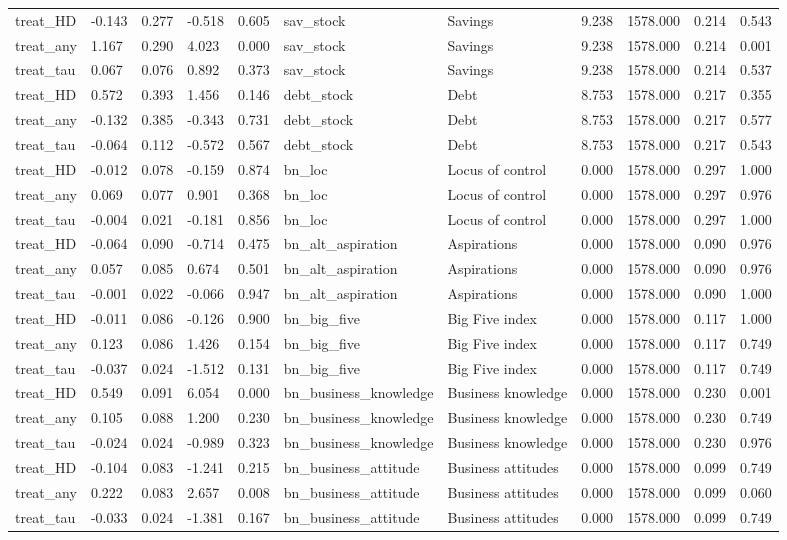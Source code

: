 \begin{tabular}{lllllllllll}
treat\_HD & -0.143 & 0.277 & -0.518 & 0.605 & sav\_stock & Savings & 9.238 & 1578.000 & 0.214 & 0.543 \\
treat\_any & 1.167 & 0.290 & 4.023 & 0.000 & sav\_stock & Savings & 9.238 & 1578.000 & 0.214 & 0.001 \\
treat\_tau & 0.067 & 0.076 & 0.892 & 0.373 & sav\_stock & Savings & 9.238 & 1578.000 & 0.214 & 0.537 \\
treat\_HD & 0.572 & 0.393 & 1.456 & 0.146 & debt\_stock & Debt & 8.753 & 1578.000 & 0.217 & 0.355 \\
treat\_any & -0.132 & 0.385 & -0.343 & 0.731 & debt\_stock & Debt & 8.753 & 1578.000 & 0.217 & 0.577 \\
treat\_tau & -0.064 & 0.112 & -0.572 & 0.567 & debt\_stock & Debt & 8.753 & 1578.000 & 0.217 & 0.543 \\
treat\_HD & -0.012 & 0.078 & -0.159 & 0.874 & bn\_loc & Locus of control & 0.000 & 1578.000 & 0.297 & 1.000 \\
treat\_any & 0.069 & 0.077 & 0.901 & 0.368 & bn\_loc & Locus of control & 0.000 & 1578.000 & 0.297 & 0.976 \\
treat\_tau & -0.004 & 0.021 & -0.181 & 0.856 & bn\_loc & Locus of control & 0.000 & 1578.000 & 0.297 & 1.000 \\
treat\_HD & -0.064 & 0.090 & -0.714 & 0.475 & bn\_alt\_aspiration & Aspirations & 0.000 & 1578.000 & 0.090 & 0.976 \\
treat\_any & 0.057 & 0.085 & 0.674 & 0.501 & bn\_alt\_aspiration & Aspirations & 0.000 & 1578.000 & 0.090 & 0.976 \\
treat\_tau & -0.001 & 0.022 & -0.066 & 0.947 & bn\_alt\_aspiration & Aspirations & 0.000 & 1578.000 & 0.090 & 1.000 \\
treat\_HD & -0.011 & 0.086 & -0.126 & 0.900 & bn\_big\_five & Big Five index & 0.000 & 1578.000 & 0.117 & 1.000 \\
treat\_any & 0.123 & 0.086 & 1.426 & 0.154 & bn\_big\_five & Big Five index & 0.000 & 1578.000 & 0.117 & 0.749 \\
treat\_tau & -0.037 & 0.024 & -1.512 & 0.131 & bn\_big\_five & Big Five index & 0.000 & 1578.000 & 0.117 & 0.749 \\
treat\_HD & 0.549 & 0.091 & 6.054 & 0.000 & bn\_business\_knowledge & Business knowledge & 0.000 & 1578.000 & 0.230 & 0.001 \\
treat\_any & 0.105 & 0.088 & 1.200 & 0.230 & bn\_business\_knowledge & Business knowledge & 0.000 & 1578.000 & 0.230 & 0.749 \\
treat\_tau & -0.024 & 0.024 & -0.989 & 0.323 & bn\_business\_knowledge & Business knowledge & 0.000 & 1578.000 & 0.230 & 0.976 \\
treat\_HD & -0.104 & 0.083 & -1.241 & 0.215 & bn\_business\_attitude & Business attitudes & 0.000 & 1578.000 & 0.099 & 0.749 \\
treat\_any & 0.222 & 0.083 & 2.657 & 0.008 & bn\_business\_attitude & Business attitudes & 0.000 & 1578.000 & 0.099 & 0.060 \\
treat\_tau & -0.033 & 0.024 & -1.381 & 0.167 & bn\_business\_attitude & Business attitudes & 0.000 & 1578.000 & 0.099 & 0.749 \\
\bottomrule
\end{tabular}
